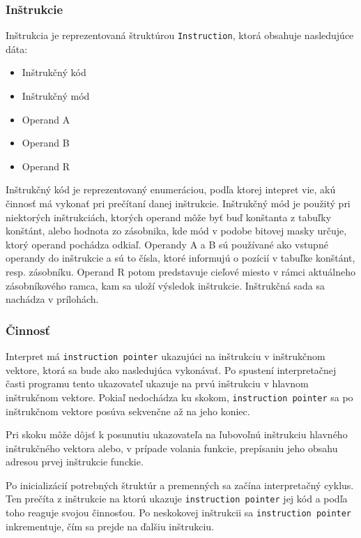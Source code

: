 \documentclass[12pt,a4paper,titlepage,final]{article}
\begin{document}
\subsubsection{Inštrukcie}
Inštrukcia je reprezentovaná štruktúrou \texttt{Instruction}, ktorá obsahuje nasledujúce dáta:
\begin{itemize}
    \itemsep0em
    \item Inštrukčný kód
    \item Inštrukčný mód
    \item Operand A
    \item Operand B
    \item Operand R
\end{itemize}
Inštrukčný kód je reprezentovaný enumeráciou, podľa ktorej intepret vie, akú činnosť má vykonať pri
prečítaní danej inštrukcie. Inštrukčný mód je použitý pri niektorých inštrukciách, ktorých operand
môže byť buď konštanta z tabuľky konštánt, alebo hodnota zo zásobnika, kde mód v podobe bitovej masky
určuje, ktorý operand pochádza odkiaľ. Operandy A a B sú používané ako vstupné operandy do inštrukcie a sú
to čísla, ktoré informujú o pozícií v tabuľke konštánt, resp. zásobníku. Operand R potom predstavuje cieľové miesto 
v rámci aktuálneho zásobníkového ramca, kam sa uloží výsledok inštrukcie. Inštrukčná sada sa nachádza v prílohách.

\subsubsection{Činnosť}
Interpret má \texttt{instruction pointer} ukazujúci na inštrukciu v inštrukčnom vektore,
ktorá sa bude ako nasledujúca vykonávať. Po spustení interpretačnej časti programu
tento ukazovateľ ukazuje na prvú inštrukciu v hlavnom inštrukčnom vektore. Pokiaľ nedochádza ku skokom,
\texttt{instruction pointer} sa po inštrukčnom vektore posúva sekvenčne až na jeho koniec.

Pri skoku môže dôjsť k posunutiu ukazovateľa na ľubovoľnú inštrukciu hlavného
inštrukčného vektora alebo, v prípade volania funkcie, prepísaniu jeho obsahu adresou prvej inštrukcie funckie.

Po inicializácií potrebných štruktúr a premenných sa začína interpretačný cyklus.
Ten prečíta z inštrukcie na ktorú ukazuje \texttt{instruction pointer} jej kód a podľa
toho reaguje svojou činnosťou. Po neskokovej inštrukcii sa \texttt{instruction pointer} inkrementuje,
čím sa prejde na ďalšiu inštrukciu.
\end{document}
